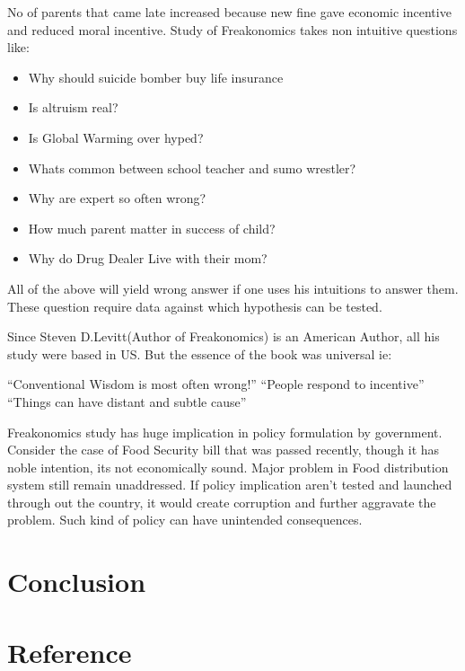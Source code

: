 \documentclass[AER]{AEA}
\begin{document}
No of parents that came late increased because new fine gave economic incentive and reduced  moral incentive.
Study of Freakonomics takes non intuitive questions like:
\begin{itemize}
\item Why should suicide bomber buy life insurance
\item Is altruism real?
\item Is Global Warming over hyped?
\item Whats common between school teacher and sumo wrestler?
\item Why are expert so often wrong?
\item How much parent matter in success of child?
\item Why do Drug Dealer Live with their mom?
\end{itemize}

All of the above will yield wrong answer if one uses his intuitions to answer them. These question require data against which hypothesis can be tested. 

Since Steven D.Levitt(Author of Freakonomics) is an American Author, all his study were based in US. But the essence of the book was universal ie:

“Conventional Wisdom is most often wrong!”
“People respond to incentive”
“Things can have distant and subtle cause”

Freakonomics study has huge implication in policy formulation by government. Consider the case of Food Security bill that was passed recently, though it has noble intention, its not economically sound. Major problem in Food distribution system still remain unaddressed. If policy implication aren't tested and launched through out the country, it would create corruption and further aggravate the problem. Such kind of policy can have unintended consequences.

\section{Conclusion}

\section{Reference}
\end{document}
